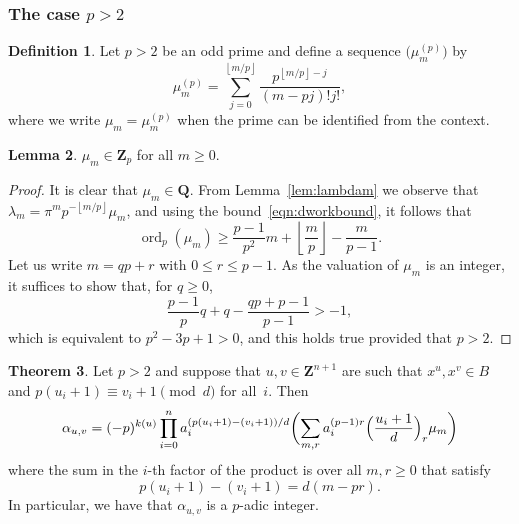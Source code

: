 \documentclass[a4paper,11pt]{article}
\numberwithin{equation}{section}
\providecommand{\floor}[1]{\left\lfloor#1\right\rfloor}   %
\newcommand{\ZZ}{\mathbf{Z}} %
\newcommand{\QQ}{\mathbf{Q}} %
\DeclareMathOperator{\ord}{ord}          %
\theoremstyle{definition}
\newtheorem{thm}{Theorem}[section]
\newtheorem{lem}[thm]{Lemma}
\newtheorem{defn}[thm]{Definition}
\begin{document}
\subsubsection{The case $p > 2$}

\begin{defn} \label{defn:mup}
Let $p >2$ be an odd prime and define a sequence 
$\bigl(\mu_m^{(p)}\bigr)$ by 
\begin{equation*}
\mu_m^{(p)} = \sum_{j=0}^{\floor{m/p}} \frac{p^{\floor{m/p} - j}}{(m-pj)! j!}, 
\end{equation*}
where we write $\mu_m = \mu_m^{(p)}$ when the prime can be identified 
from the context.
\end{defn}

\begin{lem} \label{lem:mup}
$\mu_m \in \ZZ_p$ for all $m \geq 0$.
\end{lem}

\begin{proof}
It is clear that $\mu_m \in \QQ$.  From Lemma~\ref{lem:lambdam} 
we observe that $\lambda_m = \pi^m p^{- \floor{m/p}} \mu_m$, and 
using the bound~\eqref{eqn:dworkbound}, it follows that 
\begin{equation*}
\ord_p (\mu_m) \geq \frac{p-1}{p^2} m + \floor{\frac{m}{p}} - \frac{m}{p-1}.
\end{equation*}
Let us write $m = q p + r$ with $0 \leq r \leq p-1$.  As the valuation 
of $\mu_m$ is an integer, it suffices to show that, for $q \geq 0$, 
\begin{equation*}
\frac{p-1}{p} q + q - \frac{q p + p - 1}{p - 1} > -1,
\end{equation*}
which is equivalent to $p^2 - 3p + 1 > 0$, and this holds true 
provided that $p > 2$.
\end{proof}

\begin{thm} \label{thm:alphap}
Let $p > 2$ and suppose that $u, v \in \ZZ^{n+1}$ are such 
that $x^u, x^v \in B$ and 
$p (u_i + 1) \equiv v_i + 1 \pmod{d}$ for all~$i$. Then 
\begin{equation*}
\alpha_{u,v} = (-p)^{k(u)} \prod_{i=0}^n 
    a_i^{(p (u_i + 1) - (v_i + 1))/d} \biggl( \sum_{m,r} a_i^{(p-1)r}
    \Bigl(\frac{u_i+1}{d}\Bigr)_r \mu_m \biggr)
\end{equation*}
where the sum in the $i$-th factor of the product is over all $m, r \geq 0$  
that satisfy
\[
p(u_i+1)-(v_i+1)=d(m-pr).
\]
In particular, we have that $\alpha_{u, v}$ is a $p$-adic integer. 
\end{thm}
\end{document}
